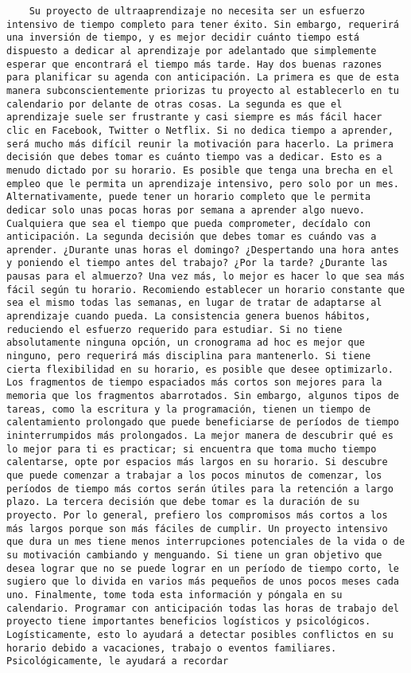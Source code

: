 \begin{verbatim}
	Su proyecto de ultraaprendizaje no necesita ser un esfuerzo intensivo de tiempo completo para tener éxito. Sin embargo, requerirá una inversión de tiempo, y es mejor decidir cuánto tiempo está dispuesto a dedicar al aprendizaje por adelantado que simplemente esperar que encontrará el tiempo más tarde. Hay dos buenas razones para planificar su agenda con anticipación. La primera es que de esta manera subconscientemente priorizas tu proyecto al establecerlo en tu calendario por delante de otras cosas. La segunda es que el aprendizaje suele ser frustrante y casi siempre es más fácil hacer clic en Facebook, Twitter o Netflix. Si no dedica tiempo a aprender, será mucho más difícil reunir la motivación para hacerlo. La primera decisión que debes tomar es cuánto tiempo vas a dedicar. Esto es a menudo dictado por su horario. Es posible que tenga una brecha en el empleo que le permita un aprendizaje intensivo, pero solo por un mes. Alternativamente, puede tener un horario completo que le permita dedicar solo unas pocas horas por semana a aprender algo nuevo. Cualquiera que sea el tiempo que pueda comprometer, decídalo con anticipación. La segunda decisión que debes tomar es cuándo vas a aprender. ¿Durante unas horas el domingo? ¿Despertando una hora antes y poniendo el tiempo antes del trabajo? ¿Por la tarde? ¿Durante las pausas para el almuerzo? Una vez más, lo mejor es hacer lo que sea más fácil según tu horario. Recomiendo establecer un horario constante que sea el mismo todas las semanas, en lugar de tratar de adaptarse al aprendizaje cuando pueda. La consistencia genera buenos hábitos, reduciendo el esfuerzo requerido para estudiar. Si no tiene absolutamente ninguna opción, un cronograma ad hoc es mejor que ninguno, pero requerirá más disciplina para mantenerlo. Si tiene cierta flexibilidad en su horario, es posible que desee optimizarlo. Los fragmentos de tiempo espaciados más cortos son mejores para la memoria que los fragmentos abarrotados. Sin embargo, algunos tipos de tareas, como la escritura y la programación, tienen un tiempo de calentamiento prolongado que puede beneficiarse de períodos de tiempo ininterrumpidos más prolongados. La mejor manera de descubrir qué es lo mejor para ti es practicar; si encuentra que toma mucho tiempo calentarse, opte por espacios más largos en su horario. Si descubre que puede comenzar a trabajar a los pocos minutos de comenzar, los períodos de tiempo más cortos serán útiles para la retención a largo plazo. La tercera decisión que debe tomar es la duración de su proyecto. Por lo general, prefiero los compromisos más cortos a los más largos porque son más fáciles de cumplir. Un proyecto intensivo que dura un mes tiene menos interrupciones potenciales de la vida o de su motivación cambiando y menguando. Si tiene un gran objetivo que desea lograr que no se puede lograr en un período de tiempo corto, le sugiero que lo divida en varios más pequeños de unos pocos meses cada uno. Finalmente, tome toda esta información y póngala en su calendario. Programar con anticipación todas las horas de trabajo del proyecto tiene importantes beneficios logísticos y psicológicos. Logísticamente, esto lo ayudará a detectar posibles conflictos en su horario debido a vacaciones, trabajo o eventos familiares. Psicológicamente, le ayudará a recordar 
\end{verbatim}
